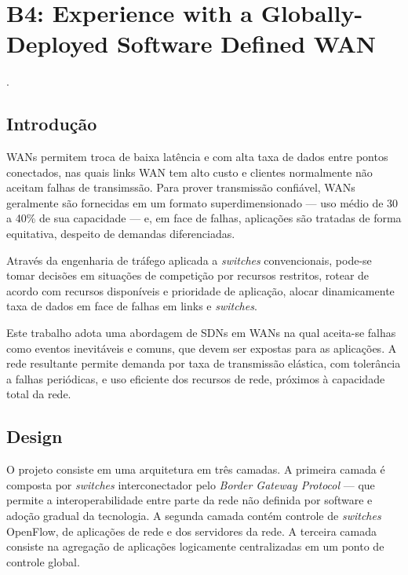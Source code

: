 
\chapter{B4: Experience with a Globally-Deployed Software Deﬁned WAN}
 \cite{jain2013b4}.


\section*{Introdução}

WANs permitem troca de baixa latência e com alta taxa de dados entre pontos conectados, nas quais links WAN tem alto custo e clientes normalmente não aceitam falhas de transimssão. Para prover transmissão confiável, WANs geralmente são fornecidas em um formato superdimensionado --- uso médio de 30 a 40\% de sua capacidade --- e, em face de falhas, aplicações são tratadas de forma equitativa, despeito de demandas diferenciadas.

Através da engenharia de tráfego aplicada a \textit{switches} convencionais, pode-se tomar decisões em situações de competição por recursos restritos, rotear de acordo com recursos disponíveis e prioridade de aplicação, alocar dinamicamente taxa de dados em face de falhas em links e \textit{switches}.

Este trabalho adota uma abordagem de SDNs em WANs na qual aceita-se falhas como eventos inevitáveis e comuns, que devem ser expostas para as aplicações. A rede resultante permite demanda por taxa de transmissão elástica, com tolerância a falhas periódicas, e uso eficiente dos recursos de rede, próximos à capacidade total da rede.


\section*{Design}

O projeto consiste em uma arquitetura em três camadas. A primeira camada é composta por \textit{switches} interconectador pelo \textit{Border Gateway Protocol} --- que permite a interoperabilidade entre parte da rede não definida por software e adoção gradual da tecnologia. A segunda camada contém controle de \textit{switches} OpenFlow, de aplicações de rede e dos servidores da rede. A terceira camada consiste na agregação de aplicações logicamente centralizadas em um ponto de controle global.

